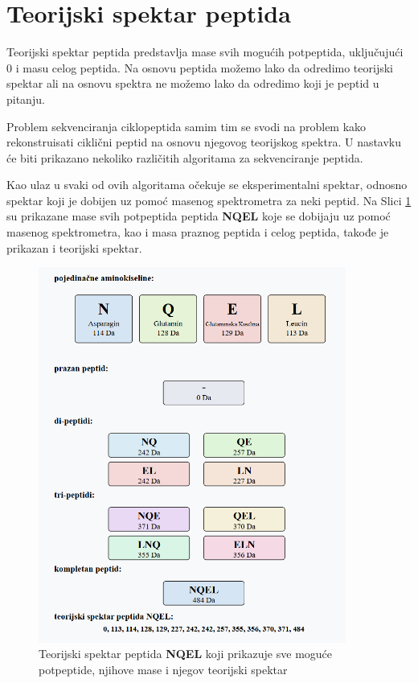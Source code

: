 \documentclass[12pt,oneside]{memoir}
\begin{document}
\section{Teorijski spektar peptida}
Teorijski spektar peptida predstavlja mase svih mogućih potpeptida, uključujući 0 i masu celog peptida. Na osnovu peptida možemo lako da odredimo teorijski spektar ali na osnovu spektra ne možemo lako da odredimo koji je peptid u pitanju.

Problem sekvenciranja ciklopeptida samim tim se svodi na problem kako rekonstruisati ciklični peptid na osnovu njegovog teorijskog spektra. U nastavku će biti prikazano nekoliko različitih algoritama za sekvenciranje peptida.

Kao ulaz u svaki od ovih algoritama očekuje se eksperimentalni spektar, odnosno spektar koji je dobijen uz pomoć masenog spektrometra za neki peptid. Na Slici \ref{fig:spektar} su prikazane mase svih potpeptida peptida \textbf{NQEL} koje se dobijaju uz pomoć masenog spektrometra, kao i masa praznog peptida i celog peptida, takođe je prikazan i teorijski spektar.

\begin{figure}[h]
  \centering
  \includegraphics[width=0.9\textwidth]{images/peptide-theoretical-spectrum.png}
  \caption{Teorijski spektar peptida \textbf{NQEL} koji prikazuje sve moguće potpeptide, njihove mase i njegov teorijski spektar}
  \label{fig:spektar}
\end{figure}
\end{document}
